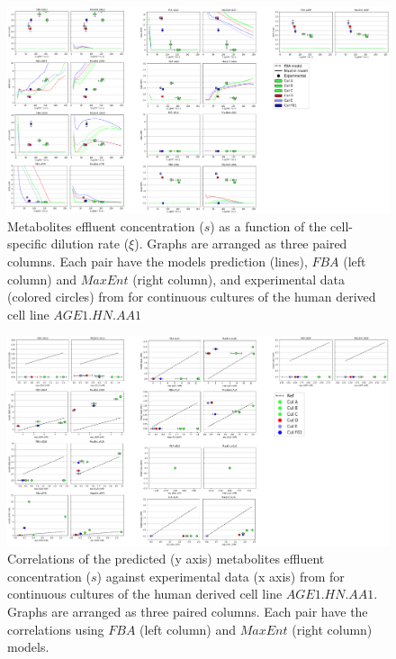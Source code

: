 \documentclass[]{article}
\begin{document}
	\begin{figure}
		\centering
		\includegraphics[scale = 0.6]{plots_s_Human}
		\caption{Metabolites effluent concentration ($s$) as a function of the cell-specific dilution rate ($\xi$). Graphs are arranged as three paired columns. Each pair have the models prediction (lines),  $FBA$ (left column) and $MaxEnt$ (right column), and experimental data (colored circles) from \protect{} for continuous cultures of the human derived cell line $AGE1.HN.AA1$}
	\end{figure}

	\begin{figure}
		\centering
		\includegraphics[scale = 0.6]{corr_s_Human}
		\caption{Correlations of the predicted (y axis) metabolites effluent concentration ($s$) against experimental data (x axis) from \protect{} for continuous cultures of the human derived cell line $AGE1.HN.AA1$. Graphs are arranged as three paired columns. Each pair have the correlations using $FBA$ (left column) and $MaxEnt$ (right column) models.}
	\end{figure}	
	
	\newpage
	
	
	
\end{document}
